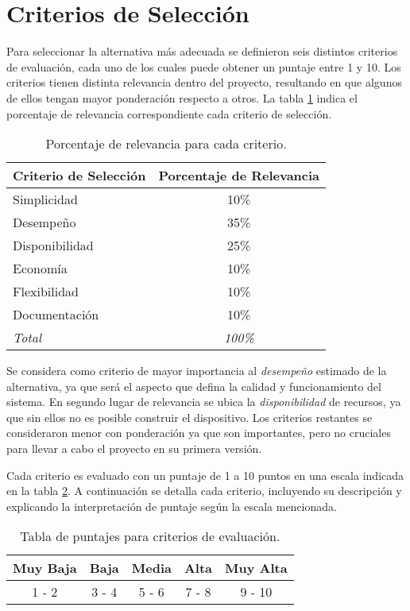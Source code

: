 \section{Criterios de Selección}
\par Para seleccionar la alternativa más adecuada se definieron seis distintos criterios de evaluación, cada uno de los cuales puede obtener un puntaje entre 1 y 10. Los criterios tienen distinta relevancia dentro del proyecto, resultando en que algunos de ellos tengan mayor ponderación respecto a otros. La tabla \ref{tab:criterios} indica el porcentaje de relevancia correspondiente cada criterio de selección. 

\begin{table}[H]
\centering
\begin{tabular}{|l|c|}
\hline
\textbf{Criterio de Selección} & \textbf{Porcentaje de Relevancia} \\ \hline
Simplicidad & 10\% \\ \hline
Desempeño & 35\% \\ \hline
Disponibilidad & 25\% \\ \hline
Economía & 10\% \\ \hline
Flexibilidad & 10\% \\ \hline
Documentación & 10\% \\ \hline
\textit{Total} & \textit{100\%} \\ \hline
\end{tabular}
\caption{Porcentaje de relevancia para cada criterio.}
\label{tab:criterios}
\end{table}

\newpage
\par Se considera como criterio de mayor importancia al \textit{desempeño} estimado de la alternativa, ya que será el aspecto que defina la calidad y funcionamiento del sistema. En segundo lugar de relevancia se ubica la \textit{disponibilidad} de recursos, ya que sin ellos no es posible construir el dispositivo. Los criterios restantes se consideraron menor con ponderación ya que son importantes, pero no cruciales para llevar a cabo el proyecto en su primera versión.
\par Cada criterio es evaluado con un puntaje de 1 a 10 puntos en una escala indicada en la tabla \ref{tab:escala}. A continuación se detalla cada criterio, incluyendo su descripción y explicando la interpretación de puntaje según la escala mencionada.

\begin{table}[H]
\centering
\begin{tabular}{lllll}
\hline
\multicolumn{1}{|c|}{\textbf{Muy Baja}} & \multicolumn{1}{c|}{\textbf{Baja}} & \multicolumn{1}{c|}{\textbf{Media}} & \multicolumn{1}{c|}{\textbf{Alta}} & \multicolumn{1}{c|}{\textbf{Muy Alta}} \\ \hline
\multicolumn{1}{|c|}{1 - 2}                 & \multicolumn{1}{c|}{3 - 4}             & \multicolumn{1}{c|}{5 - 6}           & \multicolumn{1}{c|}{7 - 8}           & \multicolumn{1}{c|}{9 - 10}              \\ \hline 
\end{tabular}
\caption{Tabla de puntajes para criterios de evaluación.}
\label{tab:escala}
\end{table}


